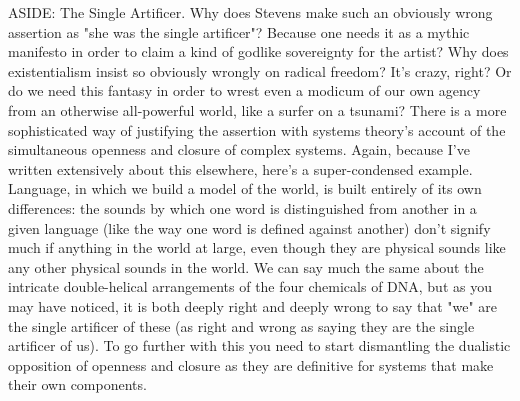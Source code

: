 \documentclass[draft]{article}
\begin{document}
\shapepar\diamondshape ASIDE: The Single Artificer. Why does Stevens make such an obviously wrong assertion as "she was the single artificer"? Because one needs it as a mythic manifesto in order to claim a kind of godlike sovereignty for the artist? Why does existentialism insist so obviously wrongly on radical freedom? It's crazy, right? Or do we need this fantasy in order to wrest even a modicum of our own agency from an otherwise all-powerful world, like a surfer on a tsunami? There is a more sophisticated way of justifying the assertion with systems theory's account of the simultaneous openness and closure of complex systems. Again, because I've written extensively about this elsewhere, here's a super-condensed example. Language, in which we build a model of the world, is built entirely of its own differences: the sounds by which one word is distinguished from another in a given language (like the way one word is defined against another) don't signify much if anything in the world at large, even though they are physical sounds like any other physical sounds in the world. We can say much the same about the intricate double-helical arrangements of the four chemicals of DNA, but as you may have noticed, it is both deeply right and deeply wrong to say that "we" are the single artificer of these (as right and wrong as saying they are the single artificer of us). To go further with this you need to start dismantling the dualistic opposition of openness and closure as they are definitive for systems that make their own components.
\end{document}

